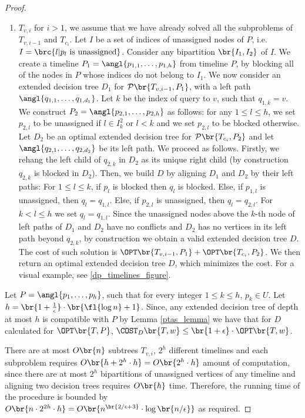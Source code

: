 \begin{theorem}
\begin{proof}
\begin{enumerate}
        \item $T_{v,i}$ for $i>1$, we assume that we have already solved all the subproblems of $T_{v,i-1}$ and $T_{c_i}$. Let $I$ be a set of indices of unassigned nodes of $P$, i.e. $I=\brc{l | p_l \text{ is unassigned}}$. Consider any bipartition $\br{I_1, I_2}$ of $I$. We create a timeline $P_1=\angl{p_{1,1},\dots,p_{1,h}}$ from timeline $P$, by blocking all of the nodes in $P$ whose indices do not belong to $I_1$. We now consider an extended decision tree $D_1$ for $\mathcal{P}\br{T_{v,i-1}, P_1}$, with a left path $\angl{q_{1,1},\dots,q_{1,d_1}}$. Let $k$ be the index of query to $v$, such that $q_{1,k}=v$. We construct $P_2=\angl{p_{2,1},\dots, p_{2,h}}$ as follows: for any $1\leq l\leq h$, we set $p_{2,l}$ to be unassigned if $l\in I_k^2$ or $l < k$ and we set $p_{2,l}$ to be blocked otherwise. Let $D_2$ be an optimal extended decision tree for $\mathcal{P}\br{T_{c_i}, P_2}$ and let $\angl{q_{2,1},\dots,q_{2,d_2}}$ be its left path. We proceed as follows. Firstly, we rehang the left child of $q_{2,k}$ in $D_2$ as its unique right child (by construction $q_{2,k}$ is blocked in $D_2$). Then, we build $D$ by aligning $D_1$ and $D_2$ by their left paths: For $1\leq l \leq k$, if $p_l$ is blocked then $q_l$ is blocked. Else, if $p_{1,l}$ is unassigned, then $q_l=q_{1,l}$. Else, if  $p_{2,l}$ is unassigned, then $q_l=q_{2,l}$. For $k<l\leq h$ we set $q_l=q_{1,l}$. Since the unassigned nodes above the $k$-th node of left paths of $D_1$ and $D_2$ have no conflicts and $D_2$ has no vertices in its left path beyond $q_{2,k}$, by construction we obtain a valid extended decision tree $D$. The cost of such solution is $\OPT\br{T_{v,i-1}, P_1}+\OPT\br{T_{c_i}, P_2}$. We then return an optimal extended decision tree $D$, which minimizes the cost. For a visual example, see \ref{dp_timelines_figure}.
    \end{enumerate}
    

    Let $P=\angl{p_1,\dots,p_h}$, such that for every integer $1\leq k \leq h$, $p_k\in U$. Let $h=\br{1+\frac{1}{\epsilon}}\cdot\br{\fl{\log n}+1}$. Since, any extended decision tree of depth at most $h$ is compatible with $P$ by Lemma \ref{ptas_lemma} we have that for $D$ calculated for $\OPT\br{T, P}$,
    $\COST_{D}\br{T,w}\leq \br{1+\epsilon}\cdot\OPT\br{T,w}$.

    There are at most $O\br{n}$ subtrees $T_{v,i}$, $2^h$ different timelines and each subproblem requires $O\br{h+2^h\cdot h}=O\br{2^h\cdot h}$ amount of computation, since there are at most $2^h$ bipartitions of unassigned vertices of any timeline and aligning two decision trees requires $O\br{h}$ time. Therefore, the running time of the procedure is bounded by $O\br{n\cdot 2^{2h}\cdot h}=O\br{n^{\br{2/\epsilon+3}}\cdot \log \br{n/\epsilon}}$ as required.
    
\end{proof}
\end{theorem}